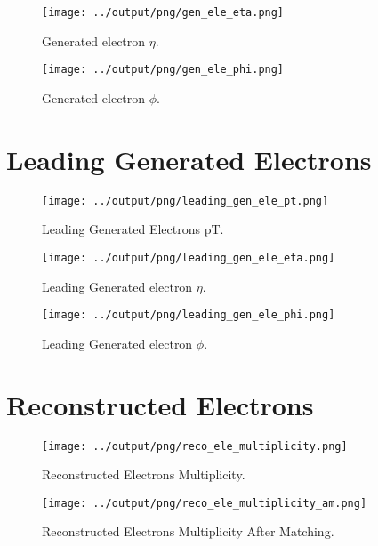\documentclass[11pt]{book}
\begin{document}
\begin{figure}[htb]
\centering
\texttt{[image: ../output/png/gen\_ele\_eta.png]}
\caption{Generated electron $\eta$.}
\label{fig:gen_ele_eta}
\end{figure}

\begin{figure}[htb]
\centering
\texttt{[image: ../output/png/gen\_ele\_phi.png]}
\caption{Generated electron $\phi$.}
\label{fig:gen_ele_phi}
\end{figure}
\clearpage

\section{Leading Generated Electrons}
\begin{figure}[htb]
\centering
\texttt{[image: ../output/png/leading\_gen\_ele\_pt.png]}
\caption{Leading Generated Electrons pT.}
\label{fig:leading_gen_ele_pt}
\end{figure}

\begin{figure}[htb]
\centering
\texttt{[image: ../output/png/leading\_gen\_ele\_eta.png]}
\caption{Leading Generated electron $\eta$.}
\label{fig:leading_gen_ele_eta}
\end{figure}

\begin{figure}[htb]
\centering
\texttt{[image: ../output/png/leading\_gen\_ele\_phi.png]}
\caption{Leading Generated electron $\phi$.}
\label{fig:leading_gen_ele_phi}
\end{figure}
\clearpage

\section{Reconstructed Electrons}

\begin{figure}[htb]
\centering
\texttt{[image: ../output/png/reco\_ele\_multiplicity.png]}
\caption{Reconstructed Electrons Multiplicity.}
\label{fig:reco_ele_multiplicity}
\end{figure}

\begin{figure}[htb]
\centering
\texttt{[image: ../output/png/reco\_ele\_multiplicity\_am.png]}
\caption{Reconstructed Electrons Multiplicity After Matching.}
\label{fig:reco_ele_multiplicity_am}
\end{figure}
\end{document}
